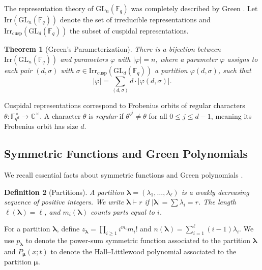 \documentclass[11pt]{article}
\newtheorem{theorem}{Theorem}[section]
\newtheorem{definition}[theorem]{Definition}
\newcommand{\Fq}{\mathbb{F}_q}
\newcommand{\Fqd}{\mathbb{F}_{q^d}}
\newcommand{\GL}{\mathrm{GL}}
\newcommand{\Irr}{\mathrm{Irr}}
\newcommand{\cusp}{\mathrm{cusp}}
\begin{document}
The representation theory of $\GL_n(\Fq)$ was completely described by Green \cite{green1955characters}. Let $\Irr(\GL_n(\Fq))$ denote the set of irreducible representations and $\Irr_{\cusp}(\GL_d(\Fq))$ the subset of cuspidal representations.
\medskip

\begin{theorem}[Green's Parameterization] \cite{green1955characters}
There is a bijection between $\Irr(\GL_n(\Fq))$ and parameters $\varphi$ with $|\varphi| = n$, where a parameter $\varphi$ assigns to each pair $(d,\sigma)$ with $\sigma \in \Irr_{\cusp}(\GL_d(\Fq))$ a partition $\varphi(d,\sigma)$, such that
\[
|\varphi| = \sum_{(d,\sigma)} d \cdot |\varphi(d,\sigma)|.
\]
\end{theorem}

Cuspidal representations correspond to Frobenius orbits of regular characters $\theta: \Fqd^\times \to \mathbb{C}^\times$. A character $\theta$ is \emph{regular} if $\theta^{q^j} \neq \theta$ for all $0 \leq j \leq d-1$, meaning its Frobenius orbit has size $d$.

\subsection{Symmetric Functions and Green Polynomials}

We recall essential facts about symmetric functions and Green polynomials \cite{macdonald1998Symmetric}.
\medskip

\begin{definition}[Partitions]
A partition $\bm{\lambda} = (\lambda_1, \ldots, \lambda_\ell)$ is a weakly decreasing sequence of positive integers. We write $\bm{\lambda} \vdash r$ if $|\bm{\lambda}| = \sum \lambda_i = r$. The length $\ell(\bm{\lambda}) = \ell$, and $m_i(\bm{\lambda})$ counts parts equal to $i$.
\end{definition}

For a partition $\bm{\lambda}$, define $z_{\bm{\lambda}} = \prod_{i \geq 1} i^{m_i} m_i!$ and $n(\bm{\lambda}) = \sum_{i=1}^{\ell} (i-1)\lambda_i$. 
We use $p_{\bm{\lambda}}$ to denote the power-sum symmetric function associated to the partition $\bm{\lambda}$ and $P_{\bm{\mu}}(x;t)$ to denote the Hall–Littlewood polynomial associated to the partition $\bm{\mu}$.
\medskip
\end{document}
